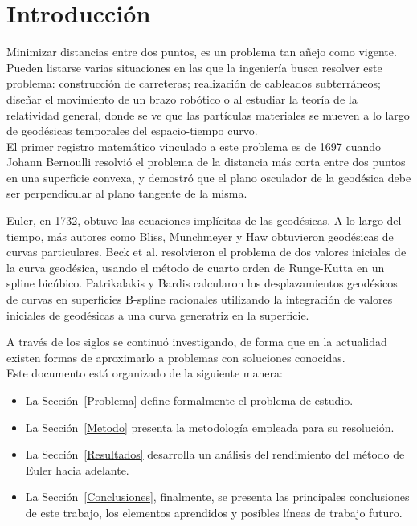 \documentclass{endm}
\begin{document}
%
\section{Introducci\'on}\label{intro}
\tab Minimizar distancias entre dos puntos, es un problema tan a\~nejo como vigente. Pueden listarse varias situaciones en las que la ingenier\'ia busca resolver este problema: construcci\'on de carreteras; realizaci\'on de cableados subterr\'aneos; dise\~nar el movimiento de un brazo rob\'otico o al estudiar la teor\'ia de la relatividad general, donde se ve que las part\'iculas materiales se mueven a lo largo de geod\'esicas temporales del espacio-tiempo curvo. \\

El primer registro matem\'atico vinculado a este problema es de 1697 cuando Johann Bernoulli resolvi\'o  el problema de la distancia m\'as corta entre dos puntos en una superficie convexa, y demostr\'o que el plano osculador de la geod\'esica debe ser perpendicular al plano tangente de la misma.

Euler, en 1732, obtuvo las ecuaciones impl\'icitas de las geod\'esicas. 
A lo largo del tiempo, m\'as autores como Bliss, Munchmeyer y Haw obtuvieron geod\'esicas de curvas particulares. Beck et al. resolvieron el problema de dos valores iniciales de la curva geod\'esica, usando el m\'etodo de cuarto orden de Runge-Kutta en un spline bic\'ubico. Patrikalakis y Bardis calcularon los desplazamientos geod\'esicos de curvas en superficies B-spline racionales utilizando la integraci\'on de valores iniciales de geod\'esicas a una curva generatriz  en la superficie.

A trav\'es de los siglos se continu\'o investigando, de forma que en la actualidad existen formas de aproximarlo a problemas con soluciones conocidas.\\ 

Este documento  est\'a organizado de la siguiente manera:
\begin{itemize}
\item La Secci\'on~\ref{Problema} define formalmente el problema de estudio.
\item La Secci\'on~\ref{Metodo} presenta la metodolog\'ia empleada para su resoluci\'on.
\item La Secci\'on~\ref{Resultados} desarrolla un an\'alisis del rendimiento del m\'etodo de Euler hacia adelante.
\item La Secci\'on~\ref{Conclusiones}, finalmente, se presenta las principales conclusiones de este trabajo, los elementos aprendidos y posibles l\'ineas de trabajo futuro.
\end{itemize}
\end{document}
